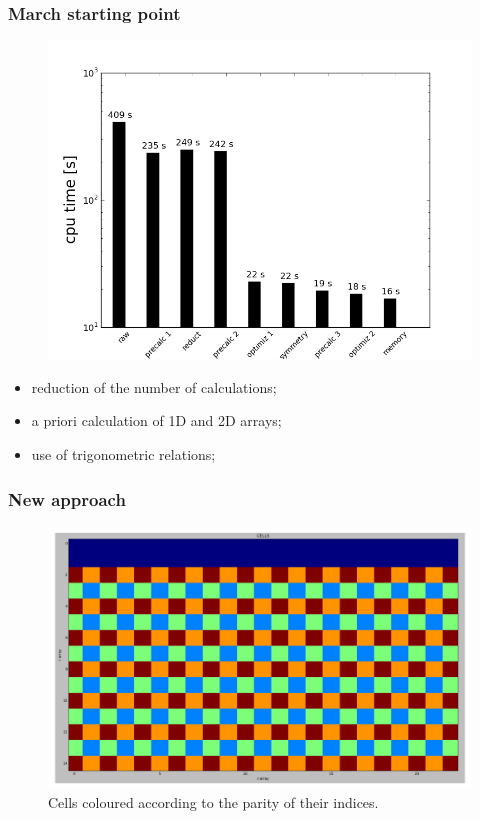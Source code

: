 \documentclass{beamer}
\newcommand\Fontvi{\fontsize{6}{7.2}\selectfont}
\begin{document}
\begin{frame}
\frametitle{March starting point}
\Fontvi
\begin{figure}
 \includegraphics[width = .5\textwidth]{./time_plot.png}
\end{figure}

\begin{itemize}
\item reduction of the number of calculations;
\item a priori calculation of 1D and 2D arrays;
\item use of trigonometric relations;
\end{itemize}

\end{frame}

\begin{frame}
\frametitle{New approach}

\begin{figure}

\includegraphics[width = \textwidth]{./cells.png}

\caption{Cells coloured according to the parity of their indices.}
\end{figure}

\end{frame}
\end{document}
